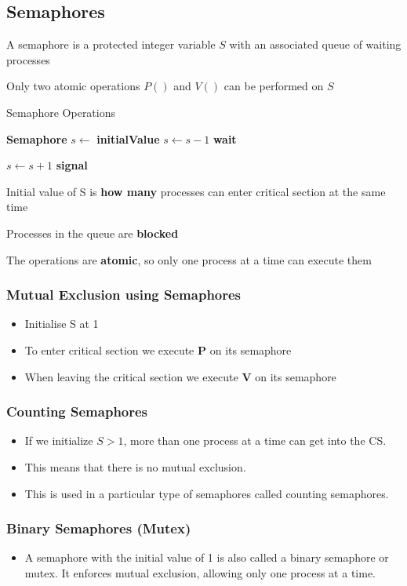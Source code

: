 \documentclass[11pt]{article}
\theoremstyle{definition}
\begin{document}
        \subsection{Semaphores}
        A semaphore is a protected integer variable $S$ with an associated queue of waiting processes


        Only two atomic operations $P()$ and $V()$ can be performed on $S$

        
\begin{algorithm}
\caption{Semaphore Operations}
\begin{algorithmic}
\State \textbf{Semaphore} $s \gets$ \textbf{initialValue} 
\State
{}
     
        \State $s \gets s - 1$ 
    \Else
        \State \textbf{wait} 
    \EndIf
\EndFunction
\State

    \State $s \gets s + 1$ 
    \State \textbf{signal} 
\EndFunction
\end{algorithmic}
\end{algorithm}


Initial value of S is \textbf{how many} processes can enter critical section at the same time


Processes in the queue are \textbf{blocked}


The operations are \textbf{atomic}, so only one process at a time can execute them

\clearpage
\subsubsection{Mutual Exclusion using Semaphores}
\begin{itemize}
    \item Initialise S at 1
    \item To enter critical section we execute \textbf{P} on its semaphore
    \item When leaving the critical section we execute \textbf{V} on its semaphore
\end{itemize}

\subsubsection{Counting Semaphores}
\begin{itemize}
  \item If we initialize \(S > 1\), more than one process at a time can get into the CS.
  \item This means that there is no mutual exclusion.
  \item This is used in a particular type of semaphores called counting semaphores.
\end{itemize}

\subsubsection{Binary Semaphores (Mutex)}
\begin{itemize}
  \item A semaphore with the initial value of 1 is also called a binary semaphore or mutex. It enforces mutual exclusion, allowing only one process at a time.
\end{itemize}
\end{document}
